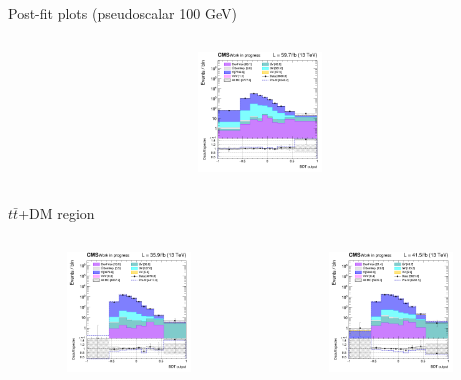\documentclass[8pt]{beamer}
\begin{document}
\begin{frame}{Post-fit plots (pseudoscalar 100 GeV)}
\begin{columns}
\begin{column}{0.33\textwidth}
\begin{center}
     			\includegraphics[width=1.0\textwidth, height=90pt]{figs/postfits/2018/log_cratio_ST_topCR_ll_BDT_tDM100_TTbar_BDT_output_pseudoscalar100_customBinsAttempt7.png}
    		\end{center}		
		\end{column}
\end{columns}

\vspace{-8pt}
\begin{columns}
\begin{column}{1.09\textwidth}
\begin{block}{\centering $t \bar t$+DM region}\end{block} \vspace{10pt}
\end{column}
\end{columns} \vspace{-16pt}
\begin{columns}
		\begin{column}{0.33\textwidth}
			\begin{center}
     			\includegraphics[width=1.0\textwidth, height=90pt]{figs/postfits/2016/log_cratio_TTbar_topCR_ll_BDT_ttDM100_TTbar_BDT_output_pseudoscalar100_customBinsAttempt7.png}
    		\end{center}		
		\end{column}
		\begin{column}{0.33\textwidth}
			\begin{center}
     			\includegraphics[width=1.0\textwidth, height=90pt]{figs/postfits/2017/log_cratio_TTbar_topCR_ll_BDT_ttDM100_TTbar_BDT_output_pseudoscalar100_customBinsAttempt7.png}

\end{center}
\end{column}
\end{columns}
\end{frame}
\end{document}
